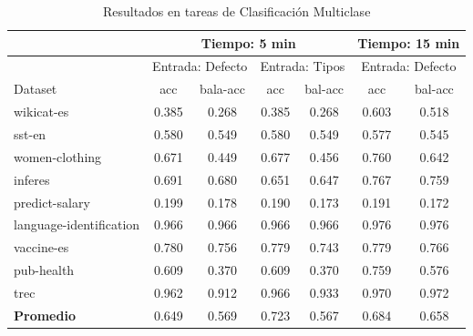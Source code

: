\begin{table}
  \centering
  \resizebox{15cm}{!} {
    \begin{tabular}{|l|cccccc|}
  \hline
          & \multicolumn{4}{p{8cm}|}{Tiempo: 5 min}  & \multicolumn{2}{p{4cm}|}{Tiempo: 15 min}\\  \hline
          & \multicolumn{2}{p{4cm}|}{Entrada: Defecto} & \multicolumn{2}{p{4cm}|}{Entrada: Tipos} & \multicolumn{2}{p{4cm}|}{Entrada: Defecto}\\ \hline
          Dataset & acc & bala-acc & acc  & bal-acc & acc & bal-acc  \\ \hline
  wikicat-es              & 0.385 & 0.268 & 0.385 & 0.268 & 0.603 & 0.518 \\
  sst-en                  & 0.580 & 0.549 & 0.580 & 0.549 & 0.577 & 0.545 \\
  women-clothing          & 0.671 & 0.449 & 0.677 & 0.456 & 0.760 & 0.642 \\ 
  inferes                 & 0.691 & 0.680 & 0.651 & 0.647 & 0.767 & 0.759 \\
  predict-salary          & 0.199 & 0.178 & 0.190 & 0.173 & 0.191 & 0.172 \\
  language-identification & 0.966 & 0.966 & 0.966 & 0.966 & 0.976 & 0.976 \\
  vaccine-es              & 0.780 & 0.756 & 0.779 & 0.743 & 0.779 & 0.766 \\
  pub-health              & 0.609 & 0.370 & 0.609 & 0.370 & 0.759 & 0.576 \\ 
  trec                    & 0.962 & 0.912 & 0.966 & 0.933 & 0.970 & 0.972 \\ \hline
  \textbf{Promedio}       & 0.649 & 0.569 & 0.723 & 0.567 & 0.684 & 0.658 \\ \hline


    \end{tabular}
  \caption{Resultados en tareas de Clasificación Multiclase}
  \label{fig:class-multi}
  }
\end{table}




